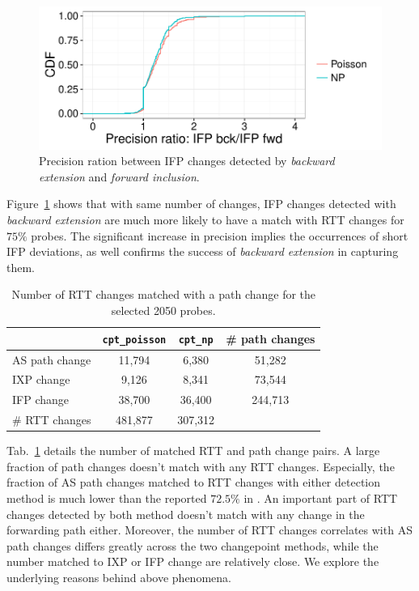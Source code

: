 \begin{figure}[!htb]
\centering
\includegraphics[width=.72\textwidth]{gfx/chap4/ifp_bck_ch_precision_gain_cdf.pdf}
\caption{Precision ration between IFP changes detected by \textit{backward extension} and \textit{forward inclusion}.}
\label{fig:ifp_bck_ch_precision_gain_cdf}
\end{figure}
Figure~\ref{fig:ifp_bck_ch_precision_gain_cdf} shows that with same number of changes, IFP changes detected with \textit{backward extension} are much more likely to have a match with RTT changes for $75\%$ probes.
The significant increase in precision implies the occurrences of short IFP deviations, as well confirms the success of \textit{backward extension} in capturing them.

\begin{table}[!htb]
\caption{Number of RTT changes matched with a path change for the selected 2050 probes.}
\label{tab:corr_overview}
\centering
\footnotesize
\setlength{\tabcolsep}{0.5em}
\begin{tabular}{l|cc|c}
\toprule
& \texttt{cpt\_poisson} & \texttt{cpt\_np} & \# path changes\\
\midrule
AS path change & 11,794 & 6,380 & 51,282 \\
IXP change & 9,126 & 8,341 & 73,544\\
IFP change & 38,700 & 36,400 & 244,713\\
\midrule
\# RTT changes & 481,877 & 307,312 & \\
\bottomrule
\end{tabular}
\end{table}

Tab.~\ref{tab:corr_overview} details the number of matched RTT and path change pairs.
A large fraction of path changes doesn't match with any RTT changes.
Especially, the fraction of AS path changes matched to RTT changes with either detection method is much lower than the reported $72.5\%$ in \cite{Rimondini2014}.
An important part of RTT changes detected by both method doesn't match with any change in the forwarding path either.
Moreover, the number of RTT changes correlates with AS path changes differs greatly across the two changepoint methods,
while the number matched to IXP or IFP change are relatively close.
We explore the underlying reasons behind above phenomena.

